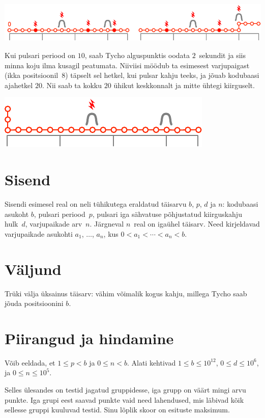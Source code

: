 \includegraphics[width=.8\textwidth]{img/sample1_2.pdf}

Kui pulsari periood on $10$, saab Tycho alguspunktis oodata $2$~sekundit ja siis minna koju
ilma kusagil peatumata.
Niiviisi möödub ta esimesest varjupaigast (ikka positsioonil~$8$) täpselt sel hetkel, kui pulsar
kahju teeks, ja jõuab kodubaasi ajahetkel $20$. Nii saab ta kokku $20$ ühikut keskkonnalt ja mitte
ühtegi kiirguselt.

\includegraphics[width=.4\textwidth]{img/sample3.pdf}

\section*{Sisend}

Sisendi esimesel real on neli tühikutega eraldatud täisarvu $b$, $p$, $d$ ja $n$:
kodubaasi asukoht $b$,
pulsari periood~$p$,
pulsari iga sähvatuse põhjustatud kiirguskahju hulk~$d$,
varjupaikade arv~$n$.
Järgneval $n$~real on igaühel täisarv. Need kirjeldavad varjupaikade asukohti
$a_1$, $\ldots$, $a_n$, kus $0<a_1<\cdots <a_n< b$. %

\section*{Väljund}

Trüki välja üksainus täisarv: vähim võimalik kogus kahju, millega Tycho saab jõuda positsioonini $b$.

\section*{Piirangud ja hindamine}

Võib eeldada, et
$1\leq p < b$ %
ja
$0 \leq n < b$. %
Alati kehtivad
$1\leq b\leq 10^{12}$, %
$0\leq d \leq 10^6$, %
ja
$0\leq n \leq 10^5$. %

Selles ülesandes on testid jagatud gruppidesse, iga grupp on väärt mingi arvu punkte.
Iga grupi eest saavad punkte vaid need lahendused, mis läbivad kõik sellesse gruppi kuuluvad testid.
Sinu lõplik skoor on esituste maksimum.

